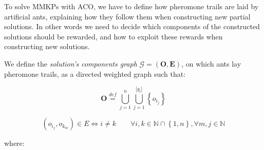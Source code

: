 \documentclass[12pt,a4paper]{report}
\newcommand{\mathDef}{\overset{\textit{def}}{=}}
\newcommand{\N}{\mathbb{N}}
\begin{document}
To solve MMKPs with ACO, we have to define how pheromone trails are laid by artificial ants, explaining how they follow them when constructing new partial solutions. In other words we need to decide which components of the constructed solutions should be rewarded, and how to exploit these rewards when constructing new solutions.

We define the \textit{solution's components graph} $\mathcal{G}=(\textbf{O},\textbf{E})$, on which ants lay pheromone trails, as a directed weighted graph such that:

\begin{equation}
	\textbf{O} \mathDef \bigcup_{j=1}^n \bigcup_{j=1}^{|g_i|} \left\{ o_{i_j} \right\}
\end{equation}

\begin{equation}
	(o_{i_j}, o_{k_m}) \in E \Leftrightarrow i \neq k \qquad \forall i,k \in \N \cap \left\{1,n\right\}, \forall m,j \in \N
\end{equation}

where: 
\end{document}
